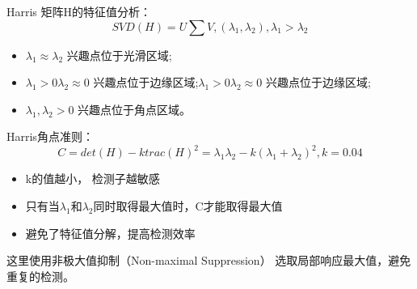 Harris 矩阵H的特征值分析：
\begin{equation*}
	SVD(H) = U \sum V, (\lambda_1, \lambda_2), \lambda_1 > \lambda_2
\end{equation*}
\begin{itemize}[leftmargin=2cm]
	\item $\lambda_1 \approx \lambda_2$ 兴趣点位于光滑区域;
	\item $\lambda_1 > 0  \lambda_2 \approx 0$ 兴趣点位于边缘区域;$\lambda_1 > 0  \lambda_2 \approx 0$ 兴趣点位于边缘区域;
	\item $\lambda_1, \lambda_2 > 0$ 兴趣点位于角点区域。
\end{itemize}

Harris角点准则：
\begin{equation*}
	C = det(H) - ktrac(H)^2 = \lambda_1\lambda_2 - k(\lambda_1 + \lambda_2)^2, k = 0.04
\end{equation*}
\begin{itemize}[leftmargin=2cm]
	\item k的值越小， 检测子越敏感
	\item 只有当$\lambda_1$和$\lambda_2$同时取得最大值时，C才能取得最大值
	\item 避免了特征值分解，提高检测效率
\end{itemize}
这里使用非极大值抑制（Non-maximal Suppression）
选取局部响应最大值，避免重复的检测。